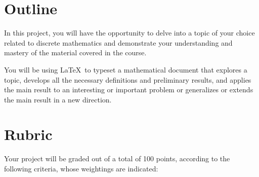 \documentclass{article}
\begin{document}
\section*{Outline}

In this project, you will have the opportunity to delve into a topic of your choice related to discrete mathematics and demonstrate your understanding and mastery of the material covered in the course.

\vspace{3mm}
You will be using \LaTeX\ to typeset a mathematical document that explores a topic, develops all the necessary definitions and preliminary results, and applies the main result to an interesting or important problem or generalizes or extends the main result in a new direction.
    
\section*{Rubric}
Your project will be graded out of a total of 100 points, according to the following criteria, whose weightings are indicated:
\end{document}
